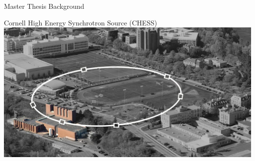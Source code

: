 \documentclass[10pt]{beamer}
\begin{document}
\begin{frame}{Master Thesis Background}
\begin{figure}
\end{figure}

	\end{frame}
	
	\begin{frame}{Cornell High Energy Synchrotron Source (CHESS)}
	\includegraphics[width=\textwidth]{Ring.jpg}
	\end{frame}
\end{document}
